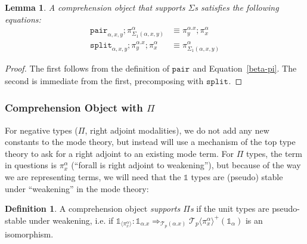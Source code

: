 \documentclass[10pt]{article}
\newtheorem{lemma}{Lemma}
\theoremstyle{definition}
\newtheorem{definition}{Definition}
\newcommand{\tcell}{\Rightarrow}
\newcommand{\id}{\mathsf{id}}
\newcommand\TrPlus[2]{\ensuremath{{#1}^+(#2)}}
\newcommand\El[2]{\mathcal{T}_{#1}(#2)}
\newcommand\ApEl[2]{\mathcal{T}_{#1}\langle#2\rangle}
\newcommand\bdot[0]{\mathbin{.}}
\newcommand\ApPlus[2]{\ensuremath{{#1}^+ \langle #2 \rangle }}
\newcommand{\sdot}{\ensuremath{\mathrm{dot}}}
\newcommand\One{\ensuremath{\mathds{1}}}
\newcommand\ApOne[1]{\ensuremath{\One_{\langle {#1} \rangle }}}
\newcommand\contract[1]{\ensuremath{\mathtt{contract}_{#1}}}
\newcommand\fibpair[1]{\ensuremath{\mathtt{fibpair}_{#1}}}
\newcommand\pair[1]{\ensuremath{\mathtt{pair}_{#1}}}
\newcommand\tsplit[1]{\ensuremath{\mathtt{split}_{#1}}}
\begin{document}

\begin{lemma}
A comprehension object that supports $\Sigma$s satisfies the following equations:
\begin{align}
\pair{\alpha,x,y};\pi^\alpha_{\Sigma_1(\alpha, x, y)} &\equiv \pi^{\alpha.x}_y;\pi^\alpha_x \\
\tsplit{\alpha,x,y};\pi^{\alpha.x}_y;\pi^\alpha_x &\equiv \pi^\alpha_{\Sigma_1(\alpha, x, y)} %
\end{align}
\end{lemma}
\begin{proof}
The first follows from the definition of $\pair{}$ and Equation~\ref{beta-pi}. The second is immediate from the first, precomposing with $\tsplit{}$. 
\end{proof}

\subsubsection[\dots with $\Pi$]{Comprehension Object with $\Pi$}

For negative types ($\Pi$, right adjoint modalities), we do not add any
new constants to the mode theory, but instead will use a mechanism of
the top type theory to ask for a right adjoint to an existing mode
term.  For $\Pi$ types, the term in questions is $\pi^\alpha_x$
(``forall is right adjoint to weakening''), but because of the way we
are representing terms, we will need that the $\One$ types are (pseudo)
stable under ``weakening'' in the mode theory: 

\begin{definition}\label{def:supports-pis}
  A comprehension object \emph{supports $\Pi$s} if
  the unit types are pseudo-stable under weakening, i.e.
  if 
  $\ApOne{\pi^\alpha_x} :
\One_{\alpha.x} \tcell_{\El{p}{\alpha.x}} \TrPlus{\ApEl p {\pi^\alpha_x}}{\One_\alpha}$ is an
isomorphism.
\end{definition}
\end{document}
